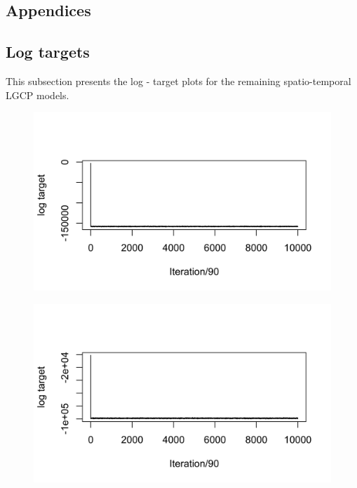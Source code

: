 
\begin{appendices}
    \chapter*{Appendices}

\section{Log targets} \label{app:log-targets}

    This subsection presents the log - target plots for the remaining spatio-temporal LGCP models.

    \begin{figure}[H]
        \begin{center}
            \includegraphics[scale=1]{Log Target Plot - ST - Major 0.png}
        \end{center}
    \end{figure}

    \begin{figure}[H]
        \begin{center}
            \includegraphics{Log Target Plot - ST - Major 2.png}
        \end{center}
    \end{figure}


\end{appendices}
